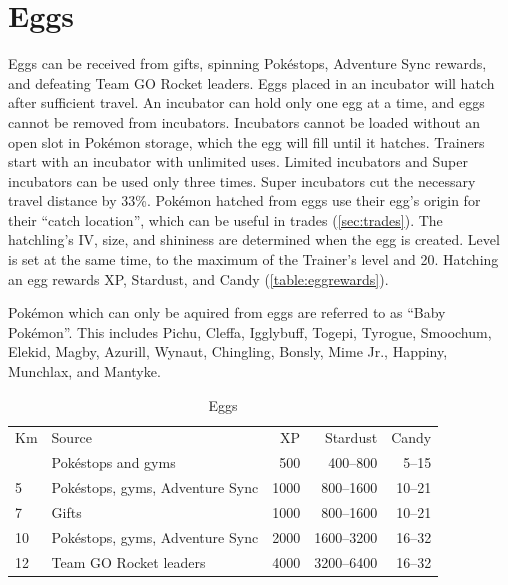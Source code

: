 \section{Eggs}
\label{sec:eggs}
Eggs can be received from gifts, spinning Pokéstops, Adventure Sync rewards,
  and defeating Team GO Rocket leaders.
Eggs placed in an incubator will hatch after sufficient travel.
An incubator can hold only one egg at a time, and eggs cannot be removed from incubators.
Incubators cannot be loaded without an open slot in Pokémon storage, which the egg will fill
 until it hatches.
Trainers start with an incubator with unlimited uses.
Limited incubators and Super incubators can be used only three times.
Super incubators cut the necessary travel distance by 33\%.
Pokémon hatched from eggs use their egg's origin for their ``catch location'',
 which can be useful in trades (\autoref{sec:trades}).
The hatchling's IV, size, and shininess are determined when the egg is created.
Level is set at the same time, to the maximum of the Trainer's level and 20.
Hatching an egg rewards XP, Stardust, and Candy (\autoref{table:eggrewards}).
\begin{tcolorbox}[enhanced,title=Baby Pokémon,halign title=flush center]
Pokémon which can only be aquired from eggs are referred to as ``Baby Pokémon''.
This includes Pichu, Cleffa, Igglybuff, Togepi, Tyrogue, Smoochum, Elekid, Magby,
 Azurill, Wynaut, Chingling, Bonsly, Mime Jr., Happiny, Munchlax, and Mantyke.
\end{tcolorbox}
\begin{table}
\centering
\begin{tabular}{llrrr}
Km & Source & XP & Stardust & Candy\\
\Midrule
  2 & Pokéstops and gyms & 500 & 400--800 & 5--15\\
  5 & Pokéstops, gyms, Adventure Sync & 1000 & 800--1600 & 10--21\\
  7 & Gifts & 1000 & 800--1600 & 10--21\\
  10 & Pokéstops, gyms, Adventure Sync & 2000 & 1600--3200 & 16--32\\
  12 & Team GO Rocket leaders & 4000 & 3200--6400 & 16--32\\
\end{tabular}
\caption{Eggs}
\label{table:eggrewards}
\end{table}

